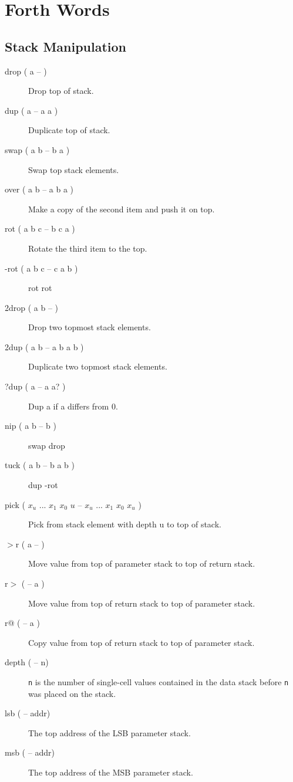 \chapter{Forth Words}

\section{Stack Manipulation}

\begin{description}

\item[drop ( a -- )] Drop top of stack.
\item[dup ( a -- a a )] Duplicate top of stack.
\item[swap ( a b -- b a )] Swap top stack elements.
\item[over ( a b -- a b a )] Make a copy of the second item and push it on top.
\item[rot ( a b c -- b c a )] Rotate the third item to the top.
\item[-rot ( a b c -- c a b )] rot rot
\item[2drop ( a b -- )] Drop two topmost stack elements.
\item[2dup ( a b -- a b a b )] Duplicate two topmost stack elements.
\item[?dup ( a -- a a? )] Dup a if a differs from 0.
\item[nip ( a b -- b )] swap drop
\item[tuck ( a b -- b a b )] dup -rot
\item[pick ( $x_u$ ... $x_1$ $x_0$ $u$ -- $x_u$ ... $x_1$ $x_0$ $x_u$ )]
Pick from stack element with depth u to top of stack.
\item[$>$r ( a -- )] Move value from top of parameter stack to top of return stack.
\item[r$>$ ( -- a )] Move value from top of return stack to top of parameter stack.
\item[r@ ( -- a )] Copy value from top of return stack to top of parameter stack.
\item[depth ( -- n)] \texttt{n} is the number of single-cell values contained in the data stack before \texttt{n} was placed on the stack.

\item[lsb ( -- addr)] The top address of the LSB parameter stack.
\item[msb ( -- addr)] The top address of the MSB parameter stack.

\end{description}

